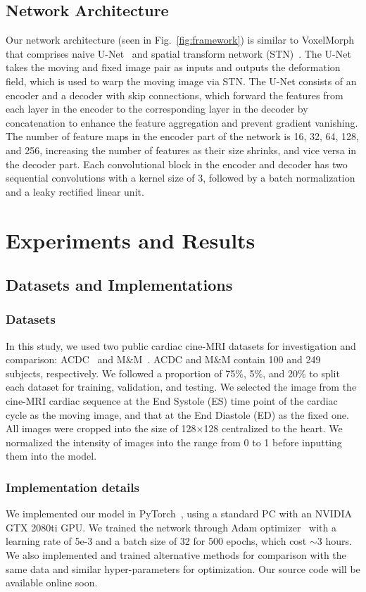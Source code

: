 \documentclass[runningheads]{llncs}
\begin{document}
\subsection{Network Architecture}
Our network architecture (seen in Fig.~\ref{fig:framework}) is similar to VoxelMorph~\cite{dalca2018unsupervised} that comprises naive U-Net~\cite{ronneberger2015u} and spatial transform network (STN)~\cite{jaderberg2015spatial}. The U-Net takes the moving and fixed image pair as inputs and outputs the deformation field, which is used to warp the moving image via STN. The U-Net consists of an encoder and a decoder with skip connections, which forward the features from each layer in the encoder to the corresponding layer in the decoder by concatenation to enhance the feature aggregation and prevent gradient vanishing. The number of feature maps in the encoder part of the network is 16, 32, 64, 128, and 256, increasing the number of features as their size shrinks, and vice versa in the decoder part. Each convolutional block in the encoder and decoder has two sequential convolutions with a kernel size of 3, followed by a batch normalization and a leaky rectified linear unit. 

\section{Experiments and Results}
\subsection{Datasets and Implementations}
\subsubsection{Datasets}
In this study, we used two public cardiac cine-MRI datasets for investigation and comparison: ACDC~\cite{bernard2018deep} and M$\&$M~\cite{campello2021multi}. ACDC and M$\&$M contain 100 and 249 subjects, respectively. We followed a proportion of 75$\%$, 5$\%$, and 20$\%$ to split each dataset for training, validation, and testing. We selected the image from the cine-MRI cardiac sequence at the End Systole (ES) time point of the cardiac cycle as the moving image, and that at the End Diastole (ED) as the fixed one. All images were cropped into the size of 128$\times$128 centralized to the heart. We normalized the intensity of images into the range from 0 to 1 before inputting them into the model.

\subsubsection{Implementation details}
We implemented our model in PyTorch~\cite{paszke2019pytorch}, using a standard PC with an NVIDIA GTX 2080ti GPU. We trained the network through Adam optimizer~\cite{kingma2014adam} with a learning rate of 5e-3 and a batch size of 32 for 500 epochs, which cost $\sim$3 hours. We also implemented and trained alternative methods for comparison with the same data and similar hyper-parameters for optimization. Our source code will be available online soon.
\end{document}
